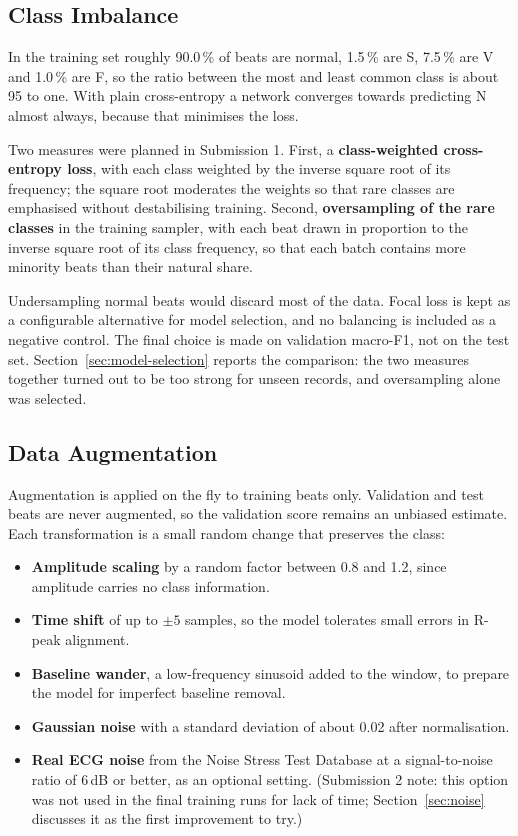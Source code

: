 \subsection{Class Imbalance}
\label{sec:class-imbalance}

In the training set roughly 90.0\,\% of beats are normal, 1.5\,\% are S, 7.5\,\% are V and 1.0\,\% are F, so the ratio between the most and least common class is about 95 to one. With plain cross-entropy a network converges towards predicting N almost always, because that minimises the loss.

Two measures were planned in Submission 1. First, a \textbf{class-weighted cross-entropy loss}, with each class weighted by the inverse square root of its frequency; the square root moderates the weights so that rare classes are emphasised without destabilising training. Second, \textbf{oversampling of the rare classes} in the training sampler, with each beat drawn in proportion to the inverse square root of its class frequency, so that each batch contains more minority beats than their natural share.

Undersampling normal beats would discard most of the data. Focal loss is kept as a configurable alternative for model selection, and no balancing is included as a negative control. The final choice is made on validation macro-F1, not on the test set. Section~\ref{sec:model-selection} reports the comparison: the two measures together turned out to be too strong for unseen records, and oversampling alone was selected.

\subsection{Data Augmentation}
\label{sec:augmentation}

Augmentation is applied on the fly to training beats only. Validation and test beats are never augmented, so the validation score remains an unbiased estimate. Each transformation is a small random change that preserves the class:

\begin{itemize}[nosep]
  \item \textbf{Amplitude scaling} by a random factor between 0.8 and 1.2, since amplitude carries no class information.
  \item \textbf{Time shift} of up to $\pm 5$ samples, so the model tolerates small errors in R-peak alignment.
  \item \textbf{Baseline wander}, a low-frequency sinusoid added to the window, to prepare the model for imperfect baseline removal.
  \item \textbf{Gaussian noise} with a standard deviation of about 0.02 after normalisation.
  \item \textbf{Real ECG noise} from the Noise Stress Test Database at a signal-to-noise ratio of 6\,dB or better, as an optional setting. (Submission 2 note: this option was not used in the final training runs for lack of time; Section~\ref{sec:noise} discusses it as the first improvement to try.)
\end{itemize}

